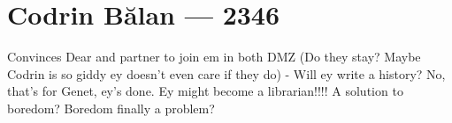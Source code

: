 \hypertarget{codrin-bux103lan-2346}{%
\chapter{Codrin Bălan — 2346}\label{codrin-bux103lan-2346}}

Convinces Dear and partner to join em in both DMZ (Do they stay? Maybe Codrin is so giddy ey doesn't even care if they do) - Will ey write a history? No, that's for Genet, ey's done. Ey might become a librarian!!!! A solution to boredom? Boredom finally a problem?
